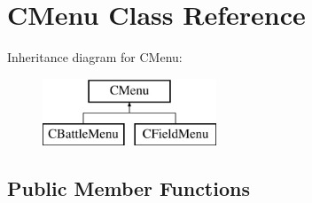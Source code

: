 \hypertarget{class_c_menu}{}\section{C\+Menu Class Reference}
\label{class_c_menu}
Inheritance diagram for C\+Menu\+:\begin{figure}[H]
\begin{center}
\leavevmode
\includegraphics[height=2.000000cm]{class_c_menu}
\end{center}
\end{figure}
\subsection*{Public Member Functions}
